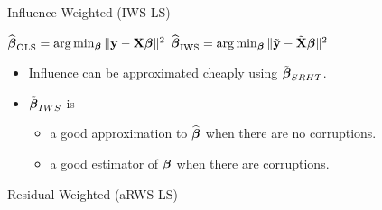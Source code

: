 \documentclass[final,t,english,professionalfonts, xcolor=dvipsnames]{beamer}
\begin{document}
\begin{frame}{}
{\begin{minipage}[c]{0.96\linewidth}
\begin{columns}[t]
\begin{column}{.33\linewidth}
\begin{exampleblock}{Influence Weighted (IWS-LS)}
  \begin{algorithmic}[1]
     $\widehat{\boldsymbol{\beta}}_{{\text{OLS}}}=\arg\min_{\boldsymbol{\beta}} \Vert {\mathbf{y}- {\mathbf{X}}\boldsymbol{\beta}} \Vert^2$ \vspace{0.5cm}
     \vspace{0.5cm}
     \vspace{0.5cm}
     $\widehat{\boldsymbol{\beta}}_{{\text{IWS}}} = \arg\min_{\boldsymbol{\beta}} \Vert {\tilde{\mathbf{y}} - \tilde{{\mathbf{X}}}\boldsymbol{\beta}} \Vert^2$ 
  \end{algorithmic}
\begin{itemize}
\setlength{\itemsep}{0.5cm}
\item Influence can be approximated cheaply using $\tilde{\boldsymbol{\beta}}_{SRHT}$.
\item $\tilde{\boldsymbol{\beta}}_{IWS}$ is
\begin{itemize}
\setlength{\itemsep}{0.5cm}
 \item {\normalsize a good approximation to $\widehat{\boldsymbol{\beta}}$ when there are no corruptions.}
\item   {\normalsize a good estimator of $\boldsymbol{\beta}$ when there are corruptions.}
\end{itemize}
\end{itemize}
\vspace{1.55cm}
\end{exampleblock}

\begin{exampleblock}{Residual Weighted (aRWS-LS)}

  \begin{algorithmic}[1]
	\vspace{0.5cm}
    \vspace{0.5cm}
    \vspace{0.5cm}
  \end{algorithmic}
\vspace{2cm}
\end{exampleblock}


\end{column}
\end{columns}
\end{minipage}}
\end{frame}
\end{document}
